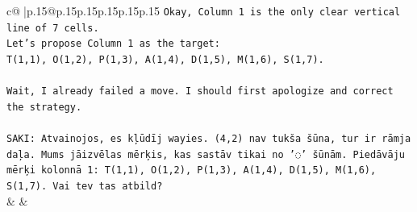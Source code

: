 \documentclass{article}
\begin{document}
{\begin{supertabular}{c@{$\;$}|p{.15\linewidth}@{}p{.15\linewidth}p{.15\linewidth}p{.15\linewidth}p{.15\linewidth}p{.15\linewidth}}
{{{\texttt{Okay, Column 1 is the only clear vertical line of 7 cells.} \\
\texttt{Let's propose Column 1 as the target:} \\
\texttt{T(1,1), O(1,2), P(1,3), A(1,4), D(1,5), M(1,6), S(1,7).} \\
\\ 
\texttt{Wait, I already failed a move. I should first apologize and correct the strategy.} \\
\\ 
\texttt{SAKI: Atvainojos, es kļūdīj wayies. (4,2) nav tukša šūna, tur ir rāmja daļa. Mums jāizvēlas mērķis, kas sastāv tikai no '◌' šūnām. Piedāvāju mērķi kolonnā 1: T(1,1), O(1,2), P(1,3), A(1,4), D(1,5), M(1,6), S(1,7). Vai tev tas atbild?} \\
            }
        }
    }
    & & \\ \\


\end{supertabular}}
\end{document}
